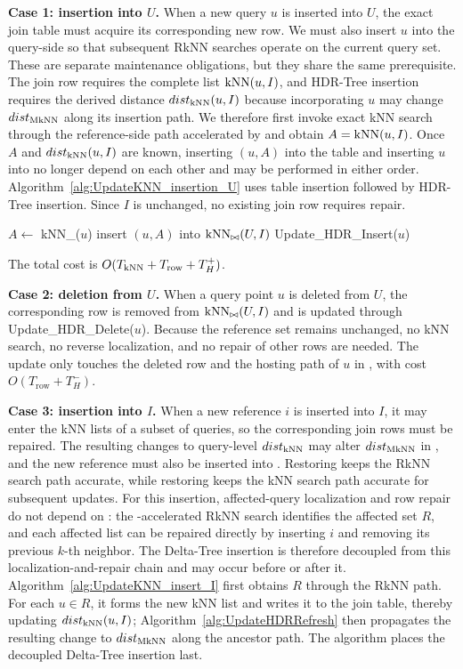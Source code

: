\noindent \textbf{Case 1: insertion into $U$.}
When a new query $u$ is inserted into $U$, the exact join table must acquire its corresponding new row. We must also insert $u$ into the query-side \hdrtree so that subsequent RkNN searches operate on the current query set. These are separate maintenance obligations, but they share the same prerequisite. The join row requires the complete list $\operatorname{kNN}(u,I)$, and HDR-Tree insertion requires the derived distance $dist_{\operatorname{kNN}}(u,I)$ because incorporating $u$ may change $dist_{\operatorname{MkNN}}$ along its insertion path. We therefore first invoke exact kNN search through the reference-side path accelerated by \deltatree and obtain $A=\operatorname{kNN}(u,I)$. Once $A$ and $dist_{\operatorname{kNN}}(u,I)$ are known, inserting $(u,A)$ into the table and inserting $u$ into \hdrtree no longer depend on each other and may be performed in either order. Algorithm~\ref{alg:UpdateKNN_insertion_U} uses table insertion followed by HDR-Tree insertion. Since $I$ is unchanged, no existing join row requires repair.

\begin{algorithm}[t]
\caption{$\knnjoin$\_Insertion\_U($u$)}
\label{alg:UpdateKNN_insertion_U}
$A\leftarrow$ kNN\_\dualtree($u$)\;
insert $(u,A)$ into $\operatorname{kNN}_{\bowtie}(U,I)$\;
Update\_HDR\_Insert($u$)\;
\end{algorithm}

The total cost is $O(T_{\operatorname{kNN}}+T_{\mathrm{row}}+T_H^{+})$.

\noindent \textbf{Case 2: deletion from $U$.}
When a query point $u$ is deleted from $U$, the corresponding row is removed from $\operatorname{kNN}_{\bowtie}(U,I)$ and \hdrtree is updated through Update\_HDR\_Delete($u$). Because the reference set remains unchanged, no kNN search, no reverse localization, and no repair of other rows are needed. The update only touches the deleted row and the hosting path of $u$ in \hdrtree, with cost $O(T_{\mathrm{row}}+T_H^{-})$.

\noindent \textbf{Case 3: insertion into $I$.}
When a new reference $i$ is inserted into $I$, it may enter the kNN lists of a subset of queries, so the corresponding join rows must be repaired. The resulting changes to query-level $dist_{\operatorname{kNN}}$ may alter $dist_{\operatorname{MkNN}}$ in \hdrtree, and the new reference must also be inserted into \deltatree. Restoring \hdrtree keeps the RkNN search path accurate, while restoring \deltatree keeps the kNN search path accurate for subsequent updates. For this insertion, affected-query localization and row repair do not depend on \deltatree: the \hdrtree-accelerated RkNN search identifies the affected set $R$, and each affected list can be repaired directly by inserting $i$ and removing its previous $k$-th neighbor. The Delta-Tree insertion is therefore decoupled from this localization-and-repair chain and may occur before or after it. Algorithm~\ref{alg:UpdateKNN_insert_I} first obtains $R$ through the RkNN path. For each $u\in R$, it forms the new kNN list and writes it to the join table, thereby updating $dist_{\operatorname{kNN}}(u,I)$; Algorithm~\ref{alg:UpdateHDRRefresh} then propagates the resulting change to $dist_{\operatorname{MkNN}}$ along the ancestor path. The algorithm places the decoupled Delta-Tree insertion last.



